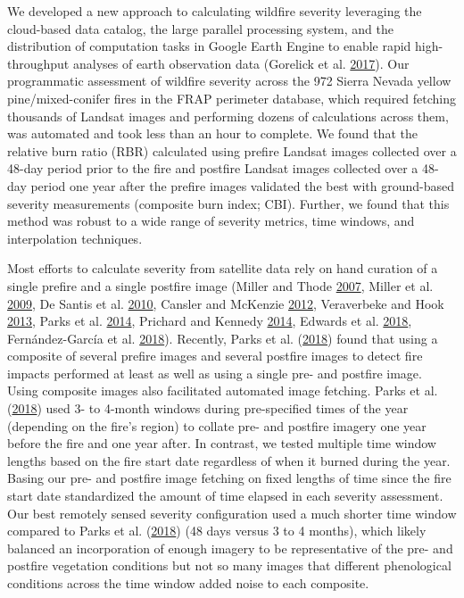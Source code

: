 \documentclass[twoside,12pt,final]{ucthesis-CA2012}
\begin{document}
\begin{ucmainmatter}
We developed a new approach to calculating wildfire severity leveraging
the cloud-based data catalog, the large parallel processing system, and
the distribution of computation tasks in Google Earth Engine to enable
rapid high-throughput analyses of earth observation data (Gorelick et
al. \protect\hyperlink{ref-gorelick2017}{2017}). Our programmatic
assessment of wildfire severity across the 972 Sierra Nevada yellow
pine/mixed-conifer fires in the FRAP perimeter database, which required
fetching thousands of Landsat images and performing dozens of
calculations across them, was automated and took less than an hour to
complete. We found that the relative burn ratio (RBR) calculated using
prefire Landsat images collected over a 48-day period prior to the fire
and postfire Landsat images collected over a 48-day period one year
after the prefire images validated the best with ground-based severity
measurements (composite burn index; CBI). Further, we found that this
method was robust to a wide range of severity metrics, time windows, and
interpolation techniques.

Most efforts to calculate severity from satellite data rely on hand
curation of a single prefire and a single postfire image (Miller and
Thode \protect\hyperlink{ref-miller2007}{2007}, Miller et al.
\protect\hyperlink{ref-miller2009a}{2009}, De Santis et al.
\protect\hyperlink{ref-desantis2010}{2010}, Cansler and McKenzie
\protect\hyperlink{ref-cansler2012}{2012}, Veraverbeke and Hook
\protect\hyperlink{ref-veraverbeke2013}{2013}, Parks et al.
\protect\hyperlink{ref-parks2014a}{2014}, Prichard and Kennedy
\protect\hyperlink{ref-prichard2014}{2014}, Edwards et al.
\protect\hyperlink{ref-edwards2018}{2018}, Fernández-García et al.
\protect\hyperlink{ref-fernandez-garcia2018}{2018}). Recently, Parks et
al. (\protect\hyperlink{ref-parks2018}{2018}) found that using a
composite of several prefire images and several postfire images to
detect fire impacts performed at least as well as using a single pre-
and postfire image. Using composite images also facilitated automated
image fetching. Parks et al. (\protect\hyperlink{ref-parks2018}{2018})
used 3- to 4-month windows during pre-specified times of the year
(depending on the fire's region) to collate pre- and postfire imagery
one year before the fire and one year after. In contrast, we tested
multiple time window lengths based on the fire start date regardless of
when it burned during the year. Basing our pre- and postfire image
fetching on fixed lengths of time since the fire start date standardized
the amount of time elapsed in each severity assessment. Our best
remotely sensed severity configuration used a much shorter time window
compared to Parks et al. (\protect\hyperlink{ref-parks2018}{2018}) (48
days versus 3 to 4 months), which likely balanced an incorporation of
enough imagery to be representative of the pre- and postfire vegetation
conditions but not so many images that different phenological conditions
across the time window added noise to each composite.


\end{ucmainmatter}
\end{document}
